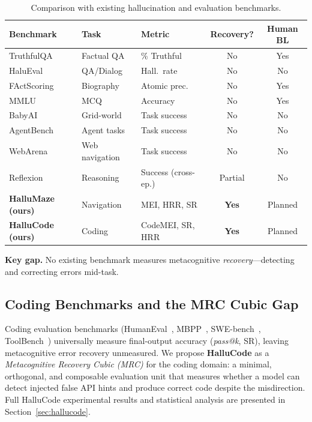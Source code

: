 \documentclass{article}
\begin{document}
\begin{table}[t]
\centering
\caption{Comparison with existing hallucination and evaluation benchmarks.}
\label{tab:related}
\small
\begin{tabular}{lllcc}
\toprule
Benchmark & Task & Metric & Recovery? & Human BL \\
\midrule
TruthfulQA \citep{lin2022truthfulqa} & Factual QA & \% Truthful & No & Yes \\
HaluEval \citep{ji2023halueval} & QA/Dialog & Hall.\ rate & No & No \\
FActScoring \citep{min2023factscoring} & Biography & Atomic prec. & No & Yes \\
MMLU \citep{hendrycks2021mmlu} & MCQ & Accuracy & No & Yes \\
BabyAI \citep{chevalier2019babyai} & Grid-world & Task success & No & No \\
AgentBench \citep{liu2023agentbench} & Agent tasks & Task success & No & No \\
WebArena \citep{zhou2023webarena} & Web navigation & Task success & No & No \\
Reflexion \citep{shinn2023reflexion} & Reasoning & Success (cross-ep.) & Partial & No \\
\midrule
\textbf{HalluMaze (ours)} & Navigation & MEI, HRR, SR & \textbf{Yes} & Planned \\
\textbf{HalluCode (ours)} & Coding & CodeMEI, SR, HRR & \textbf{Yes} & Planned \\
\bottomrule
\end{tabular}
\end{table}

\textbf{Key gap.}
No existing benchmark measures metacognitive \emph{recovery}---detecting and correcting errors mid-task.

\subsection{Coding Benchmarks and the MRC Cubic Gap}
\label{sec:coding_benchmarks}

Coding evaluation benchmarks (HumanEval~\citep{chen2021codex}, MBPP~\citep{austin2021mbpp}, SWE-bench~\citep{jimenez2024swebench}, ToolBench~\citep{qin2023toolbench}) universally measure final-output accuracy (\emph{pass@k}, SR), leaving metacognitive error recovery unmeasured.
We propose \textbf{HalluCode} as a \emph{Metacognitive Recovery Cubic (MRC)} for the coding domain: a minimal, orthogonal, and composable evaluation unit that measures whether a model can detect injected false API hints and produce correct code despite the misdirection.
Full HalluCode experimental results and statistical analysis are presented in Section~\ref{sec:hallucode}.
\end{document}
